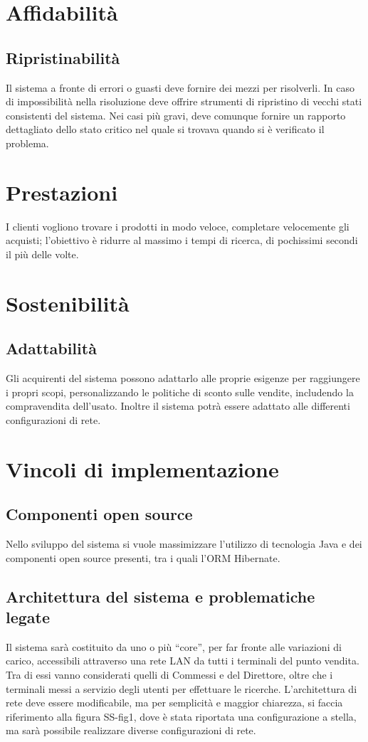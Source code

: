 \documentclass[a4paper,10pt]{report}
\begin{document}
 \section*{Affidabilità}
 \subsection*{Ripristinabilità}
Il sistema a fronte di errori o guasti deve fornire dei mezzi per risolverli. In caso di impossibilità nella risoluzione deve offrire strumenti di ripristino di vecchi stati consistenti del sistema. Nei casi più gravi, deve comunque fornire un rapporto dettagliato dello stato critico nel quale si trovava quando si è verificato il problema.

 \section*{Prestazioni}
I clienti vogliono trovare i prodotti in modo veloce, completare velocemente gli acquisti; l'obiettivo è ridurre al massimo i tempi di ricerca, di pochissimi secondi il più delle volte.

 \section*{Sostenibilità}
 \subsection*{Adattabilità}
Gli acquirenti del sistema possono adattarlo alle proprie esigenze per raggiungere i propri scopi, personalizzando le politiche di sconto sulle vendite, includendo la compravendita dell'usato. Inoltre il sistema potrà essere adattato alle differenti configurazioni di rete.


 \section*{Vincoli di implementazione}

 \subsection*{Componenti open source}
Nello sviluppo del sistema si vuole massimizzare l'utilizzo di tecnologia Java e dei componenti open source presenti, tra i quali l'ORM Hibernate.

 \subsection*{Architettura del sistema e problematiche legate}
Il sistema sarà costituito da uno o più “core”, per far fronte alle variazioni di carico, accessibili attraverso una rete LAN da tutti i terminali del punto vendita. Tra di essi vanno considerati quelli di Commessi e del Direttore, oltre che i terminali messi a servizio degli utenti per effettuare le ricerche.
L’architettura di rete deve essere modificabile, ma per semplicità e maggior chiarezza, si faccia riferimento alla figura SS-fig1, dove è stata riportata una configurazione a stella, ma sarà possibile realizzare diverse configurazioni di rete.
\end{document}
